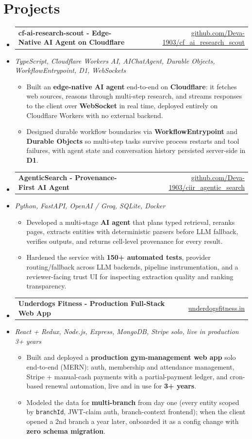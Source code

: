 \documentclass[letterpaper,10pt]{article}
\makeatletter
\newcommand{\resumeItem}[1]{
  \item\small{#1\vspace{-1pt}}
}
\newcommand{\resumeProjectHeading}[2]{
    \item
    \begin{tabular*}{0.985\textwidth}[t]{l@{\extracolsep{\fill}}r}
      \small\textbf{#1} & \small #2 \\
    \end{tabular*}\vspace{-5pt}
}
\newcommand{\resumeProjectSubheading}[1]{
  \vspace{-2pt}\item[] {\small\textcolor{ResumeSlate}{\emph{#1}}}\vspace{-3pt}
}
\newcommand{\resumeSubHeadingListStart}{\begin{itemize}[leftmargin=0.0in, label={}, itemsep=2pt, topsep=2pt]}
\newcommand{\resumeSubHeadingListEnd}{\end{itemize}}
\newcommand{\resumeItemListStart}{\begin{itemize}[leftmargin=0.18in, itemsep=2pt, topsep=1pt]}
\newcommand{\resumeItemListEnd}{\end{itemize}\vspace{-4pt}}
\makeatother
\begin{document}
\section{Projects}
\resumeSubHeadingListStart
  \resumeProjectHeading
    {cf-ai-research-scout - Edge-Native AI Agent on Cloudflare}
    {\href{https://github.com/Deva-1903/cf_ai_research_scout}{github.com/Deva-1903/cf\_ai\_research\_scout}}
  \resumeProjectSubheading{TypeScript, Cloudflare Workers AI, AIChatAgent, Durable Objects, WorkflowEntrypoint, D1, WebSockets}
    \resumeItemListStart
      \resumeItem{Built an \textbf{edge-native AI agent} end-to-end on \textbf{Cloudflare}: it fetches web sources, reasons through multi-step research, and streams responses to the client over \textbf{WebSocket} in real time, deployed entirely on Cloudflare Workers with no external backend.}
      \resumeItem{Designed durable workflow boundaries via \textbf{WorkflowEntrypoint} and \textbf{Durable Objects} so multi-step tasks survive process restarts and tool failures, with agent state and conversation history persisted server-side in \textbf{D1}.}
    \resumeItemListEnd
  \resumeProjectHeading
    {AgenticSearch - Provenance-First AI Agent}
    {\href{https://github.com/Deva-1903/ciir_agentic_search}{github.com/Deva-1903/ciir\_agentic\_search}}
  \resumeProjectSubheading{Python, FastAPI, OpenAI / Groq, SQLite, Docker}
    \resumeItemListStart
      \resumeItem{Developed a multi-stage \textbf{AI agent} that plans typed retrieval, reranks pages, extracts entities with deterministic parsers before LLM fallback, verifies outputs, and returns cell-level provenance for every result.}
      \resumeItem{Hardened the service with \textbf{150+ automated tests}, provider routing/fallback across LLM backends, pipeline instrumentation, and a reviewer-facing trust UI for inspecting extraction quality and ranking transparency.}
    \resumeItemListEnd
  \resumeProjectHeading
    {Underdogs Fitness - Production Full-Stack Web App}
    {\href{https://www.underdogsfitness.in/}{underdogsfitness.in}}
  \resumeProjectSubheading{React + Redux, Node.js, Express, MongoDB, Stripe \enspace\textbar\enspace solo, live in production 3+ years}
    \resumeItemListStart
      \resumeItem{Built and deployed a \textbf{production gym-management web app} solo end-to-end (MERN): auth, membership and attendance management, Stripe + manual-cash payments with a partial-payment ledger, and cron-based renewal automation, live and in use for \textbf{3+ years}.}
      \resumeItem{Modeled the data for \textbf{multi-branch} from day one (every entity scoped by \texttt{branchId}, JWT-claim auth, branch-context frontend); when the client opened a 2nd branch a year later, onboarded it as a config change with \textbf{zero schema migration}.}
    \resumeItemListEnd
\resumeSubHeadingListEnd
\vspace{-4pt}
\end{document}
